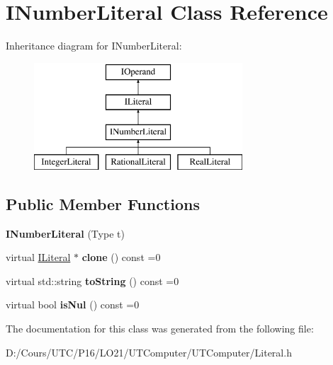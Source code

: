 \hypertarget{class_i_number_literal}{}\section{I\+Number\+Literal Class Reference}
\label{class_i_number_literal}
Inheritance diagram for I\+Number\+Literal\+:\begin{figure}[H]
\begin{center}
\leavevmode
\includegraphics[height=4.000000cm]{class_i_number_literal}
\end{center}
\end{figure}
\subsection*{Public Member Functions}
\begin{DoxyCompactItemize}
\item 
{\bfseries I\+Number\+Literal} (Type t)\hypertarget{class_i_number_literal_afb9e8612805650a50a62bd2779ff66db}{}\label{class_i_number_literal_afb9e8612805650a50a62bd2779ff66db}

\item 
virtual \hyperlink{class_i_literal}{I\+Literal} $\ast$ {\bfseries clone} () const  =0\hypertarget{class_i_number_literal_a3e78bd7e2b716c09f347df1e961e8c41}{}\label{class_i_number_literal_a3e78bd7e2b716c09f347df1e961e8c41}

\item 
virtual std\+::string {\bfseries to\+String} () const  =0\hypertarget{class_i_number_literal_acb2b75d8ed6dc0e8808af25700cd3a01}{}\label{class_i_number_literal_acb2b75d8ed6dc0e8808af25700cd3a01}

\item 
virtual bool {\bfseries is\+Nul} () const  =0\hypertarget{class_i_number_literal_ada51adfb9a7a2867b3bacee49dfb42df}{}\label{class_i_number_literal_ada51adfb9a7a2867b3bacee49dfb42df}

\end{DoxyCompactItemize}


The documentation for this class was generated from the following file\+:\begin{DoxyCompactItemize}
\item 
D\+:/\+Cours/\+U\+T\+C/\+P16/\+L\+O21/\+U\+T\+Computer/\+U\+T\+Computer/Literal.\+h\end{DoxyCompactItemize}

